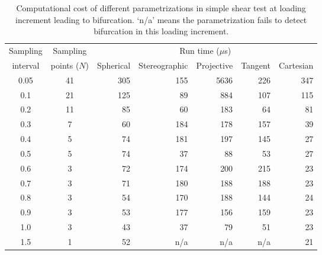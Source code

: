\documentclass[12pt]{article}
\numberwithin{equation}{section}
\begin{document}
\begin{table}[H]
  \begin{center}
    \begin{tabular}{c c | r r r r r}
      \toprule
      Sampling   & Sampling &   \multicolumn{5}{c}{Run time ($\mu$s)}	\\
      interval     & points ($N$)     &  Spherical    &   Stereographic  &   Projective  &   Tangent   & Cartesian  \\
      \midrule
      0.05      &      41     &    305        &       155       &       5636      &      226       &       347         \\
      0.1        &      21     &    125        &       89         &       884        &      107       &       115         \\
      0.2        &      11     &    85          &       60         &       183        &      64         &       81         \\
      0.3        &      7       &    60          &       184       &       178        &      157       &       39          \\
      0.4        &      5       &    74          &       181       &       197        &      145       &       27          \\
      0.5        &	    5       &    74          &       37         &       88          &      53         &       27          \\
      0.6        &	    3       &    72          &       174       &       200        &      215       &       23          \\
      0.7        &	    3       &    71	      &       180       &       188        &      188       &       23          \\
      0.8        &      3       &    54          &       170       &       188        &      144       &       24          \\
      0.9        &	    3       &    53          &       177       &       156        &      159       &       23          \\
      1.0        &      3	     &    43	      &       37         &       79          &      51         &       23          \\
      1.5        &	    1       &    52	      &       n/a        &       n/a         &      n/a        &       21          \\
      \bottomrule
    \end{tabular}
    \caption{Computational cost of different parametrizations in
    simple shear test at loading increment leading to bifurcation.
    `n/a' means the parametrization fails to detect bifurcation in
    this loading increment.}
    \label{tab:iso_shear_runtime}
  \end{center}
\end{table}
\end{document}
